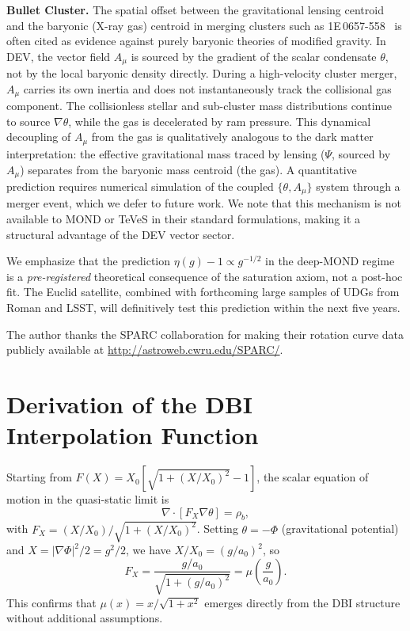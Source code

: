 \documentclass[aps,prd,twocolumn,showpacs,superscriptaddress]{revtex4-2}
\newcommand{\aO}{a_0}
\newcommand{\Xzero}{X_0}
\begin{document}
\textbf{Bullet Cluster.}
The spatial offset between the gravitational lensing centroid
and the baryonic (X-ray gas) centroid in merging clusters
such as 1E\,0657-558~\cite{Clowe2006} is often cited as
evidence against purely baryonic theories of modified gravity.
In DEV, the vector field $A_\mu$ is sourced by the gradient
of the scalar condensate $\theta$, not by the local baryonic
density directly.
During a high-velocity cluster merger, $A_\mu$ carries
its own inertia and does not instantaneously track the
collisional gas component.
The collisionless stellar and sub-cluster mass distributions
continue to source $\nabla\theta$, while the gas
is decelerated by ram pressure.
This dynamical decoupling of $A_\mu$ from the gas is
qualitatively analogous to the dark matter interpretation:
the effective gravitational mass traced by lensing
($\Psi$, sourced by $A_\mu$) separates from the baryonic
mass centroid (the gas).
A quantitative prediction requires numerical simulation
of the coupled $\{\theta, A_\mu\}$ system through a merger
event, which we defer to future work.
We note that this mechanism is not available to
MOND or TeVeS in their standard formulations,
making it a structural advantage of the DEV vector sector.

We emphasize that the prediction $\eta(g) - 1 \propto g^{-1/2}$
in the deep-MOND regime is a \emph{pre-registered} theoretical
consequence of the saturation axiom, not a post-hoc fit.
The Euclid satellite, combined with forthcoming large samples of
UDGs from Roman and LSST, will definitively test this prediction
within the next five years.

\begin{acknowledgments}
The author thanks the SPARC collaboration for making
their rotation curve data publicly available at
\url{http://astroweb.cwru.edu/SPARC/}.
\end{acknowledgments}

\appendix

\section{Derivation of the DBI Interpolation Function}
\label{app:DBI}

Starting from $F(X) = \Xzero[\sqrt{1+(X/\Xzero)^2}-1]$,
the scalar equation of motion in the quasi-static limit is
\begin{equation}
  \nabla\cdot[F_X\nabla\theta] = \rho_b,
\end{equation}
with $F_X = (X/\Xzero)/\sqrt{1+(X/\Xzero)^2}$.
Setting $\theta = -\Phi$ (gravitational potential) and
$X = |\nabla\Phi|^2/2 = g^2/2$, we have $X/\Xzero = (g/\aO)^2$, so
\begin{equation}
  F_X = \frac{g/\aO}{\sqrt{1+(g/\aO)^2}} = \mu\!\left(\frac{g}{\aO}\right).
\end{equation}
This confirms that $\mu(x) = x/\sqrt{1+x^2}$ emerges
directly from the DBI structure without additional assumptions.
\end{document}
